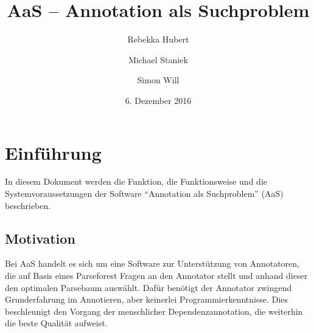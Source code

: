 \documentclass{scrartcl}
\title{AaS – Annotation als Suchproblem}
\author{Rebekka Hubert \and Michael Staniek \and Simon Will}
\date{6. Dezember 2016}
\begin{document}
\maketitle

\section{Einführung}
\label{sec:Einfuehrung}
In diesem Dokument werden die Funktion, die Funktionsweise und die Systemvoraussetzungen der Software \enquote{Annotation als Suchproblem} (AaS) beschrieben.

\subsection{Motivation}
\label{sub:Motivation}
Bei AaS handelt es sich um eine Software zur Unterstützung von Annotatoren, die auf Basis eines Parseforest Fragen an den Annotator stellt und anhand dieser den optimalen Parsebaum auswählt. Dafür benötigt der Annotator zwingend Grunderfahrung im Annotieren, aber keinerlei Programmierkenntnisse. Dies beschleunigt den Vorgang der  menschlicher Dependenzannotation, die weiterhin die beste Qualität aufweist.
\end{document}
